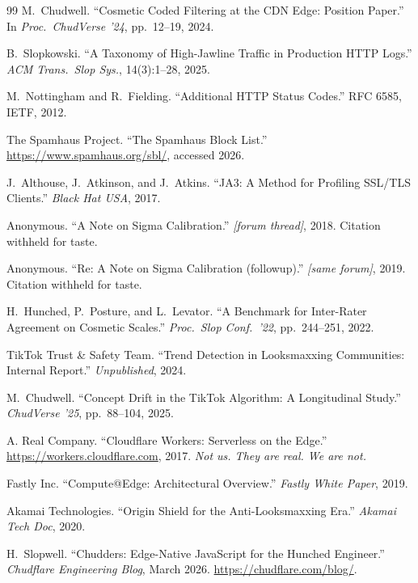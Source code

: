 \documentclass[10pt,twocolumn,letterpaper]{article}
\begin{document}
\begin{thebibliography}{99}
\small
{}
M.~Chudwell.
``Cosmetic Coded Filtering at the CDN Edge: Position Paper.''
In \textit{Proc.\ ChudVerse '24}, pp.\ 12--19, 2024.

B.~Slopkowski.
``A Taxonomy of High-Jawline Traffic in Production HTTP Logs.''
\textit{ACM Trans.\ Slop Sys.}, 14(3):1--28, 2025.

M.~Nottingham and R.~Fielding.
``Additional HTTP Status Codes.''
RFC 6585, IETF, 2012.

The Spamhaus Project.
``The Spamhaus Block List.''
\url{https://www.spamhaus.org/sbl/}, accessed 2026.

J.~Althouse, J.~Atkinson, and J.~Atkins.
``JA3: A Method for Profiling SSL/TLS Clients.''
\textit{Black Hat USA}, 2017.

Anonymous.
``A Note on Sigma Calibration.''
\textit{[forum thread]}, 2018. Citation withheld for taste.

Anonymous.
``Re: A Note on Sigma Calibration (followup).''
\textit{[same forum]}, 2019. Citation withheld for taste.

H.~Hunched, P.~Posture, and L.~Levator.
``A Benchmark for Inter-Rater Agreement on Cosmetic Scales.''
\textit{Proc.\ Slop Conf.\ '22}, pp.\ 244--251, 2022.

TikTok Trust \& Safety Team.
``Trend Detection in Looksmaxxing Communities: Internal Report.''
\textit{Unpublished}, 2024.

M.~Chudwell.
``Concept Drift in the TikTok Algorithm: A Longitudinal Study.''
\textit{ChudVerse '25}, pp.\ 88--104, 2025.

A. Real Company.
``Cloudflare Workers: Serverless on the Edge.''
\url{https://workers.cloudflare.com}, 2017. \textit{Not us. They are real. We are not.}

Fastly Inc.
``Compute@Edge: Architectural Overview.''
\textit{Fastly White Paper}, 2019.

Akamai Technologies.
``Origin Shield for the Anti-Looksmaxxing Era.''
\textit{Akamai Tech Doc}, 2020.

H.~Slopwell.
``Chudders: Edge-Native JavaScript for the Hunched Engineer.''
\textit{Chudflare Engineering Blog}, March 2026.
\url{https://chudflare.com/blog/}.
\end{thebibliography}
\end{document}

